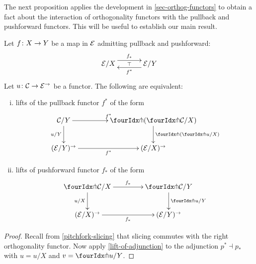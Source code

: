 \documentclass[reqno,10pt,a4paper,oneside]{amsart}
\begin{document}
The next proposition applies the development in \cref{sec-orthog-functors} to obtain 
a fact about the interaction of orthogonality functors with the pullback and pushforward
functors. This will be useful to establish our main result.

\begin{proposition}
\label{lift-dependent-product}
Let $f \colon X \to Y$ be a map in $\mathcal{E}$ admitting pullback and pushforward:
\[
\xymatrix@C+1em{
  \catE/X
  \ar@<5pt>[r]^{f_*}
  \ar@{}[r]|{\top}
&
  \catE/Y
  \ar@<5pt>[l]^{f^*}
}
\]
Let $u \colon \mathcal{C} \to \mathcal{E}^{\to}$ be a functor. The following are
equivalent:
\begin{enumerate}[(i)]
\item lifts of the pullback functor $f^*$ of the form
\[
\xymatrix@C=1.5cm{
  \cal{C}/Y
   \ar[r]^{f^*}
  \ar[d]_{u/Y} 
  &
  \liftl{ ( \liftr{\cal{C}}/X ) }
  \ar[d]^{\liftl{(\liftr{u}/X)}}
     \\
     (\catE/Y)^{\to} \ar[r]_{f^*} &
   (\catE/X)^{\to} 
}
\]
\item lifts of pushforward functor $f_*$ of the form
\[
\xymatrix@C=1.5cm{
\liftr{\cal{C}}/X
\ar[r]^{f_*}
  \ar[d]_{u/X}
&
  \liftr{\cal{C}}/Y
  \ar[d]^{\liftr{u}/Y}
\\
  (\catE/X)^{\to}
   \ar[r]_{f_*}
&
  (\catE/Y)^{\to}
 }
\]
\begin{comment}
\item functors $F$ making the following diagram commute:
\[
\xymatrix@C=1.2cm@R=1.5cm{
\liftr{\cal{C}}/X \ar[rr]^F \ar[dr]_{\liftr{u}/X} & &  \liftr{\cal{C}}/ Y \ar[dl]^(.4){\ \liftr{( (u/Y) \cc f^*)}}  \\
 & (\cal{E}/X)^\to & }
\]
\end{comment}
\end{enumerate}
\end{proposition}

\begin{proof}
Recall from \cref{pitchfork-slicing} that slicing commutes with the right orthogonality functor.
Now apply \cref{lift-of-adjunction} to the adjunction $p^* \dashv p_*$ with $u = u/X$ and $v = \liftr{u}/Y$.
\end{proof}
\end{document}
